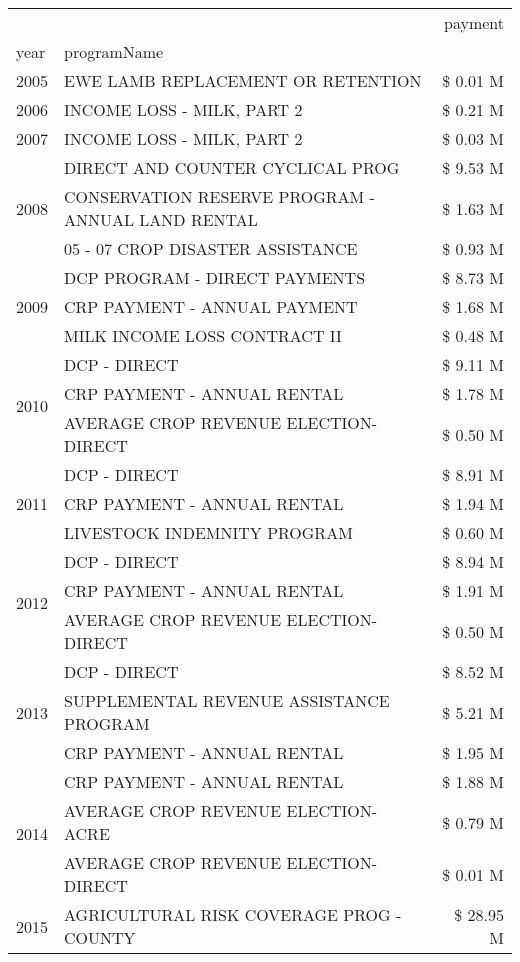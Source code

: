 \begin{tabular}{llr}
\toprule
 &  & payment \\
year & programName &  \\
\midrule
2005 & EWE LAMB REPLACEMENT OR RETENTION & \$ 0.01 M \\
\cline{1-3}
2006 & INCOME LOSS - MILK, PART 2 & \$ 0.21 M \\
\cline{1-3}
2007 & INCOME LOSS - MILK, PART 2 & \$ 0.03 M \\
\cline{1-3}
\multirow[t]{3}{*}{2008} & DIRECT AND COUNTER CYCLICAL PROG & \$ 9.53 M \\
 & CONSERVATION RESERVE PROGRAM - ANNUAL LAND RENTAL & \$ 1.63 M \\
 & 05 - 07 CROP DISASTER ASSISTANCE & \$ 0.93 M \\
\cline{1-3}
\multirow[t]{3}{*}{2009} & DCP PROGRAM - DIRECT PAYMENTS & \$ 8.73 M \\
 & CRP PAYMENT - ANNUAL PAYMENT & \$ 1.68 M \\
 & MILK INCOME LOSS CONTRACT II & \$ 0.48 M \\
\cline{1-3}
\multirow[t]{3}{*}{2010} & DCP - DIRECT & \$ 9.11 M \\
 & CRP PAYMENT - ANNUAL RENTAL & \$ 1.78 M \\
 & AVERAGE CROP REVENUE ELECTION-DIRECT & \$ 0.50 M \\
\cline{1-3}
\multirow[t]{3}{*}{2011} & DCP - DIRECT & \$ 8.91 M \\
 & CRP PAYMENT - ANNUAL RENTAL & \$ 1.94 M \\
 & LIVESTOCK INDEMNITY PROGRAM & \$ 0.60 M \\
\cline{1-3}
\multirow[t]{3}{*}{2012} & DCP - DIRECT & \$ 8.94 M \\
 & CRP PAYMENT - ANNUAL RENTAL & \$ 1.91 M \\
 & AVERAGE CROP REVENUE ELECTION-DIRECT & \$ 0.50 M \\
\cline{1-3}
\multirow[t]{3}{*}{2013} & DCP - DIRECT & \$ 8.52 M \\
 & SUPPLEMENTAL REVENUE ASSISTANCE PROGRAM & \$ 5.21 M \\
 & CRP PAYMENT - ANNUAL RENTAL & \$ 1.95 M \\
\cline{1-3}
\multirow[t]{3}{*}{2014} & CRP PAYMENT - ANNUAL RENTAL & \$ 1.88 M \\
 & AVERAGE CROP REVENUE ELECTION-ACRE & \$ 0.79 M \\
 & AVERAGE CROP REVENUE ELECTION-DIRECT & \$ 0.01 M \\
\cline{1-3}
\multirow[t]{3}{*}{2015} & AGRICULTURAL RISK COVERAGE PROG - COUNTY & \$ 28.95 M \\

\end{tabular}
